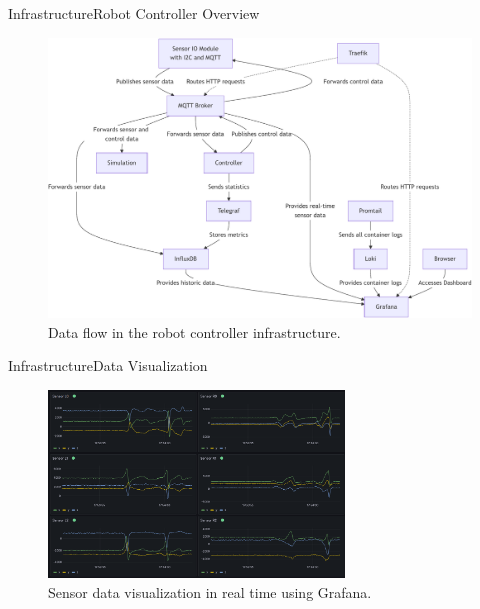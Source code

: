 \documentclass[AIRbeamer
,optEnglish
,optBiber
,optBibstyleAlphabetic
,optBeamerClassicFormat%
]{AIRlatex}
\begin{document}
    \begin{frame}{Infrastructure}{Robot Controller Overview}
        \begin{figure}[H]
            \centering
            \includegraphics[height=0.75\textheight]{figures/infrastructure-robot-controller}
            \caption{Data flow in the robot controller infrastructure.}
        \end{figure}
    \end{frame}

    \begin{frame}{Infrastructure}{Data Visualization}
        \begin{figure}[H]
            \centering
            \includegraphics[width=0.7\textwidth]{figures/grafana}
            \caption{Sensor data visualization in real time using Grafana.}
        \end{figure}
    \end{frame}
\end{document}
